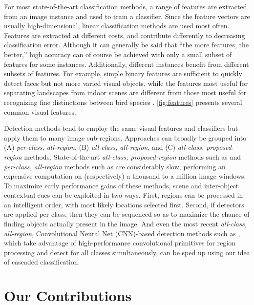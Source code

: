 For most state-of-the-art classification methods, a range of features are extracted from an image instance and used to train a classifier.
Since the feature vectors are usually high-dimensional, linear classification methods are used most often.
Features are extracted at different costs, and contribute differently to decreasing classification error.
Although it can generally be said that ``the more features, the better,'' high accuracy can of course be achieved with only a small subset of features for some instances.
Additionally, different instances benefit from different subsets of features.
For example, simple binary features are sufficient to quickly detect faces \parencite{Viola-IJCV-2004} but not more varied visual objects, while the features most useful for separating landscapes from indoor scenes \parencite{Xiao-CVPR-2010} are different from those most useful for recognizing fine distinctions between bird species \parencite{Farrell-ICCV-2011}.
\autoref{fig:features} presents several common visual features.

Detection methods tend to employ the same visual features and classifiers but apply them to many image sub-regions.
Approaches can broadly be grouped into (A) \emph{per-class, all-region}, (B) \emph{all-class, all-region}, and (C) \emph{all-class, proposed-region} methods.
State-of-the-art \emph{all-class, proposed-region} methods such as \cite{Girshick-CVPR-2014} and \emph{per-class, all-region} methods such as \cite{Felzenszwalb2010a} are considerably slow, performing an expensive computation on (respectively) a thousand to a million image windows.
To maximize early performance gains of these methods, scene and inter-object contextual cues can be exploited in two ways.
First, regions can be processed in an intelligent order, with most likely locations selected first.
Second, if detectors are applied per class, then they can be sequenced so as to maximize the chance of finding objects actually present in the image.
And even the most recent \emph{all-class, all-region}, Convolutional Neural Net (CNN)-based detection methods such as \cite{He-ECCV-2014}, which take advantage of high-performance convolutional primitives for region processing and detect for all classes simultaneously, can be sped up using our idea of cascaded classification.

\section{Our Contributions}

